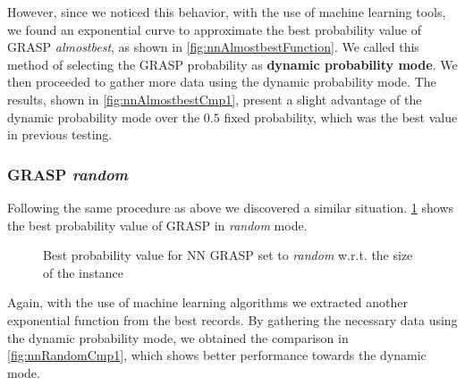 However, since we noticed this behavior, with the use of machine learning tools, we found an exponential curve to approximate the best probability value of GRASP \textit{almostbest}, as shown in \figurename{ \ref{fig:nnAlmostbestFunction}}.
We called this method of selecting the GRASP probability as \textbf{dynamic probability mode}.
We then proceeded to gather more data using the dynamic probability mode.
The results, shown in \figurename{ \ref{fig:nnAlmostbestCmp1}}, present a slight advantage of the dynamic probability mode over the $0.5$ fixed probability, which was the best value in previous testing.

\subsubsection{GRASP \textit{random}}

Following the same procedure as above we discovered a similar situation.
\figurename{ \ref{fig:nnRandomFunction}} shows the best probability value of GRASP in \textit{random} mode.

\begin{figure}[htbp]
	\centering
	\caption{Best probability value for NN GRASP set to \textit{random} w.r.t. the size of the instance}
    \label{fig:nnRandomFunction}
\end{figure}

Again, with the use of machine learning algorithms we extracted another exponential function from the best records.
By gathering the necessary data using the dynamic probability mode, we obtained the comparison in \figurename{ \ref{fig:nnRandomCmp1}}, which shows better performance towards the dynamic mode.

